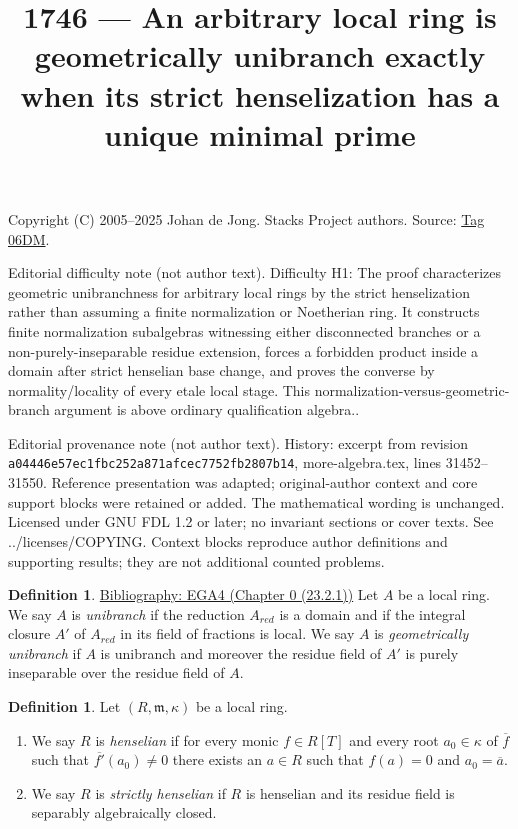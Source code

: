 \documentclass{amsart}
\newenvironment{reference}{\comment}{\endcomment}
\theoremstyle{plain}
\theoremstyle{definition}
\newtheorem{definition}[subsection]{Definition}
\theoremstyle{remark}
\numberwithin{equation}{subsection}
\begin{document}
\title[Stacks Project, Tag 06DM]{1746 --- An arbitrary local ring is geometrically unibranch exactly when its strict henselization has a unique minimal prime}
\maketitle
\noindent Copyright (C) 2005--2025 Johan de Jong. Stacks Project authors. Source: \href{https://stacks.math.columbia.edu/tag/06DM}{Tag 06DM}.

\noindent Editorial difficulty note (not author text). Difficulty H1: The proof characterizes geometric unibranchness for arbitrary local rings by the strict henselization rather than assuming a finite normalization or Noetherian ring. It constructs finite normalization subalgebras witnessing either disconnected branches or a non-purely-inseparable residue extension, forces a forbidden product inside a domain after strict henselian base change, and proves the converse by normality/locality of every etale local stage. This normalization-versus-geometric-branch argument is above ordinary qualification algebra..

\noindent Editorial provenance note (not author text). History: excerpt from revision \texttt{a0444\allowbreak 6e57e\allowbreak c1fbc\allowbreak 252a8\allowbreak 71afc\allowbreak ec775\allowbreak 2fb28\allowbreak 07b14}, more-algebra.tex, lines 31452--31550. Reference presentation was adapted; original-author context and core support blocks were retained or added. The mathematical wording is unchanged. Licensed under GNU FDL 1.2 or later; no invariant sections or cover texts. See ../licenses/COPYING. Context blocks reproduce author definitions and supporting results; they are not additional counted problems.

\begin{definition}
\label{definition-unibranch}
\begin{reference}
\href{https://stacks.math.columbia.edu/bibliography}{Bibliography: EGA4 (Chapter 0 (23.2.1))}
\end{reference}
Let $A$ be a local ring. We say $A$ is {\it unibranch}
if the reduction $A_{red}$ is a domain and if the integral closure
$A'$ of $A_{red}$ in its field of fractions is local.
We say $A$ is {\it geometrically unibranch} if $A$ is unibranch
and moreover the residue field of $A'$ is purely inseparable over
the residue field of $A$.
\end{definition}

\begin{definition}
\label{algebra-definition-henselian}
Let $(R, \mathfrak m, \kappa)$ be a local ring.
\begin{enumerate}
\item We say $R$ is {\it henselian} if for every monic $f \in R[T]$ and
every root $a_0 \in \kappa$ of $\overline{f}$ such that
$\overline{f'}(a_0) \not = 0$
there exists an $a \in R$ such that $f(a) = 0$ and
$a_0 = \overline{a}$.
\item We say $R$ is {\it strictly henselian} if $R$ is henselian
and its residue field is separably algebraically closed.
\end{enumerate}
\end{definition}
\end{document}
